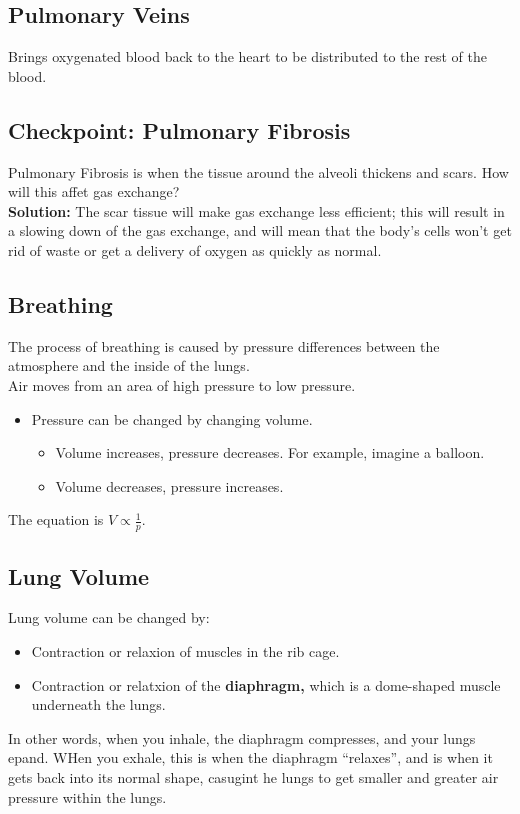 \documentclass[12pt]{report}
\begin{document}
\subsection{Pulmonary Veins}
\begin{definition}
    Brings oxygenated blood back to the heart to be distributed to the rest of the blood.
\end{definition}

\subsection{Checkpoint: Pulmonary Fibrosis}
Pulmonary Fibrosis is when the tissue around the alveoli thickens and scars. How will this affet gas exchange?\\ 

\textbf{Solution:} The scar tissue will make gas exchange less efficient; this will result in a slowing down of the gas exchange, and will mean that the body's cells won't get rid of waste or get a delivery of oxygen as quickly as normal.

\subsection{Breathing}
\begin{definition}[Breathing]
    The process of breathing is caused by pressure differences between the atmosphere and the inside of the lungs.\\ 

    Air moves from an area of high pressure to low pressure.
    \begin{itemize}
        \item{Pressure can be changed by changing volume.}
            \begin{itemize}
                \item{Volume increases, pressure decreases. For example, imagine a balloon.}
                \item{Volume decreases, pressure increases.}
            \end{itemize}
    \end{itemize}
    The equation is $V\propto \frac{1}{p}.$
\end{definition}

\subsection{Lung Volume}
\begin{definition}
    Lung volume can be changed by: 
    \begin{itemize}
        \item{Contraction or relaxion of muscles in the rib cage.}
        \item{Contraction or relatxion of the \textbf{diaphragm,} which is a dome-shaped muscle underneath the lungs.}
    \end{itemize}
    In other words, when you inhale, the diaphragm compresses, and your lungs epand. WHen you exhale, this is when the diaphragm ``relaxes'', and is when it gets back into its normal shape, casugint he lungs to get smaller and greater air pressure within the lungs.
\end{definition}
\end{document}
